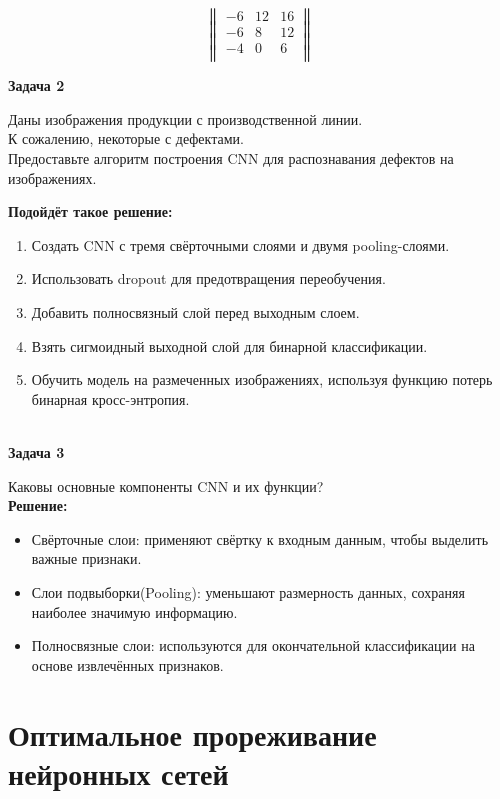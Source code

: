 \begin{description}
$$
\begin{Vmatrix}
-6 & 12 & 16 \\
-6 & 8 & 12 \\
-4 & 0 & 6 \\
\end{Vmatrix}
$$

\newpage
\textbf{Задача 2}

Даны изображения продукции с производственной линии.\\
К сожалению, некоторые с дефектами.\\
Предоставьте алгоритм построения CNN для распознавания дефектов на изображениях.

\textbf{Подойдёт такое решение:}

\begin{enumerate}
    \item Создать CNN с тремя свёрточными слоями и двумя pooling-слоями.
    \item Использовать dropout для предотвращения переобучения.
    \item Добавить полносвязный слой перед выходным слоем.
    \item Взять сигмоидный выходной слой для бинарной классификации.
    \item Обучить модель на размеченных изображениях, используя функцию потерь бинарная кросс-энтропия.\end{enumerate}\\

\textbf{Задача 3}

Каковы основные компоненты CNN и их функции?\\
\textbf{Решение:}
\begin{itemize}
    \item Свёрточные слои: применяют свёртку к входным данным, чтобы выделить важные признаки.
    \item Слои подвыборки(Pooling): уменьшают размерность данных, сохраняя наиболее значимую информацию.
    \item Полносвязные слои: используются для окончательной классификации на основе извлечённых признаков.
\end{itemize}

\end{description}


\section*{Оптимальное прореживание нейронных сетей}

